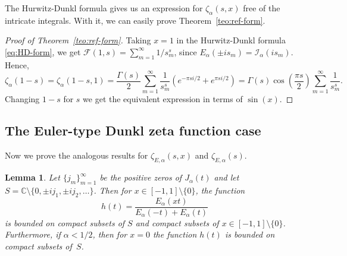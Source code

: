 \documentclass[a4paper]{amsart}
\newcommand{\C}{\mathbb{C}}
\newcommand{\I}{\mathcal{I}}
\newcommand{\Ea}{E_{\alpha}}
\theoremstyle{plain}
\newtheorem{lemma}[theorem]{Lemma}
\theoremstyle{definition}
\theoremstyle{remark}
\numberwithin{equation}{section}
\begin{document}
The Hurwitz-Dunkl formula gives us an expression for $\zeta_\alpha(s,x)$ free of the intricate integrals. With it, we can easily prove Theorem~\ref{teo:ref-form}.

\begin{proof}[Proof of Theorem~\ref{teo:ref-form}]
Taking $x=1$ in the Hurwitz-Dunkl formula \eqref{eq:HD-form}, we get $\mathcal{F}(1,s) = \sum_{m=1}^{\infty} {1}/{s_m^s}$, since $\Ea(\pm i s_m) = \I_{\alpha}(i s_m)$. Hence, 
\begin{equation*}
\zeta_{\alpha}(1-s) = \zeta_{\alpha}(1-s,1) 
= \frac{\Gamma(s)}{2} \sum_{m=1}^{\infty} 
\frac{1}{s_m^s} \left( e^{-\pi s i/2} + e^{\pi s i/2}\right) 
= \Gamma(s) \cos{\left(\frac{\pi s}{2}\right)} \sum_{m=1}^{\infty} \frac{1}{s_m^s} .
\end{equation*}
Changing $1-s$ for $s$ we get the equivalent expression in terms of $\sin(x)$.
\end{proof}

\subsection{The Euler-type Dunkl zeta function case}
\label{subsec:proofszEa}

Now we prove the analogous results for $\zeta_{E,\alpha}(s,x)$ and $\zeta_{E,\alpha}(s)$.

\begin{lemma}
\label{lem:acot-h}
Let $\{j_m\}_{m=1}^{\infty}$ be the positive zeros of $J_{\alpha}(t)$ and
let $S=\C\setminus\{0,\allowbreak \pm ij_1,\allowbreak \pm ij_2,\allowbreak \dots \}$.
Then for $x\in [-1,1]\setminus \{0\}$, the function 
\[
h(t) = \frac{\Ea(xt)}{\Ea(-t)+\Ea(t)}
\]
is bounded on compact subsets of $S$ and compact subsets of $x\in [-1,1]\setminus \{0\}$.
Furthermore, if $\alpha < 1/2$, then for $x=0$ the function $h(t)$ is bounded on compact subsets of~$S$.
\end{lemma}
\end{document}

